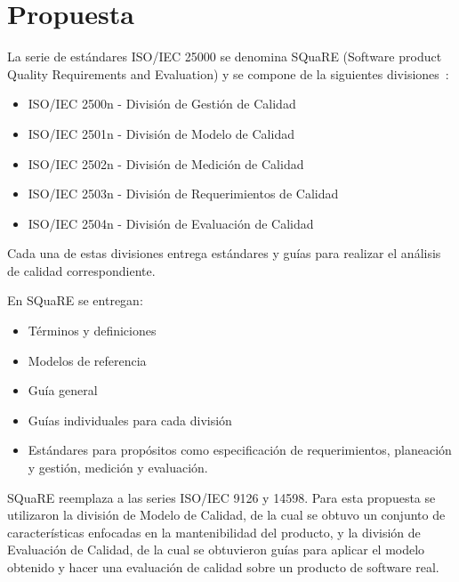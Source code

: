 
\chapter{Propuesta}

La serie de estándares ISO/IEC 25000 se denomina SQuaRE (Software product
Quality Requirements and Evaluation) y se compone de la siguientes divisiones~\cite{25000}:

\begin{itemize}
    \item ISO/IEC 2500n - División de Gestión de Calidad
    \item ISO/IEC 2501n - División de Modelo de Calidad
    \item ISO/IEC 2502n - División de Medición de Calidad
    \item ISO/IEC 2503n - División de Requerimientos de Calidad
    \item ISO/IEC 2504n - División de Evaluación de Calidad
\end{itemize}

Cada una de estas divisiones entrega estándares y guías para realizar
el análisis de calidad correspondiente. 

En SQuaRE se entregan:
\begin{itemize}
    \item Términos y definiciones
    \item Modelos de referencia
    \item Guía general
    \item Guías individuales para cada división
    \item Estándares para propósitos como especificación de requerimientos, 
    planeación y gestión, medición y evaluación.
\end{itemize}

SQuaRE reemplaza a las series ISO/IEC 9126 y 14598.
Para esta propuesta se utilizaron la división de Modelo de Calidad, de la cual
se obtuvo un conjunto de características enfocadas en la mantenibilidad del 
producto, y la división de Evaluación de Calidad, de la cual se obtuvieron
guías para aplicar el modelo obtenido y hacer una evaluación de calidad
sobre un producto de software real.

